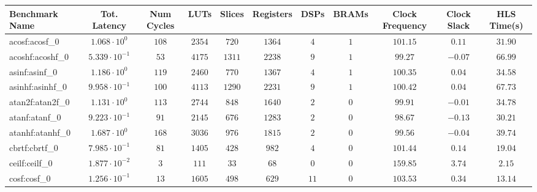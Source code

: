\begin{tabular}{|l|c|c|c|c|c|c|c|c|c|c|}
\hline
Benchmark Name               & Tot. Latency            & Num Cycles & LUTs      & Slices    & Registers & DSPs    & BRAMs & Clock Frequency & Clock Slack & HLS Time(s) \\
\hline
acosf:acosf\_0               & $ 1.068 \cdot 10^{0}  $ & $ 108    $ & $ 2354  $ & $ 720   $ & $ 1364  $ & $ 4   $ & $ 1 $ & $ 101.15      $ & $ 0.11    $ & $ 31.90   $ \\
acoshf:acoshf\_0             & $ 5.339 \cdot 10^{-1} $ & $ 53     $ & $ 4175  $ & $ 1311  $ & $ 2238  $ & $ 9   $ & $ 1 $ & $ 99.27       $ & $ -0.07   $ & $ 66.99   $ \\
asinf:asinf\_0               & $ 1.186 \cdot 10^{0}  $ & $ 119    $ & $ 2460  $ & $ 770   $ & $ 1367  $ & $ 4   $ & $ 1 $ & $ 100.35      $ & $ 0.04    $ & $ 34.58   $ \\
asinhf:asinhf\_0             & $ 9.958 \cdot 10^{-1} $ & $ 100    $ & $ 4113  $ & $ 1290  $ & $ 2231  $ & $ 9   $ & $ 1 $ & $ 100.42      $ & $ 0.04    $ & $ 67.73   $ \\
atan2f:atan2f\_0             & $ 1.131 \cdot 10^{0}  $ & $ 113    $ & $ 2744  $ & $ 848   $ & $ 1640  $ & $ 2   $ & $ 0 $ & $ 99.91       $ & $ -0.01   $ & $ 34.78   $ \\
atanf:atanf\_0               & $ 9.223 \cdot 10^{-1} $ & $ 91     $ & $ 2145  $ & $ 676   $ & $ 1283  $ & $ 2   $ & $ 0 $ & $ 98.67       $ & $ -0.13   $ & $ 30.21   $ \\
atanhf:atanhf\_0             & $ 1.687 \cdot 10^{0}  $ & $ 168    $ & $ 3036  $ & $ 976   $ & $ 1815  $ & $ 2   $ & $ 0 $ & $ 99.56       $ & $ -0.04   $ & $ 39.74   $ \\
cbrtf:cbrtf\_0               & $ 7.985 \cdot 10^{-1} $ & $ 81     $ & $ 1405  $ & $ 428   $ & $ 982   $ & $ 4   $ & $ 0 $ & $ 101.44      $ & $ 0.14    $ & $ 19.04   $ \\
ceilf:ceilf\_0               & $ 1.877 \cdot 10^{-2} $ & $ 3      $ & $ 111   $ & $ 33    $ & $ 68    $ & $ 0   $ & $ 0 $ & $ 159.85      $ & $ 3.74    $ & $ 2.15    $ \\
cosf:cosf\_0                 & $ 1.256 \cdot 10^{-1} $ & $ 13     $ & $ 1605  $ & $ 498   $ & $ 629   $ & $ 11  $ & $ 0 $ & $ 103.53      $ & $ 0.34    $ & $ 13.14   $ \\

\end{tabular}
